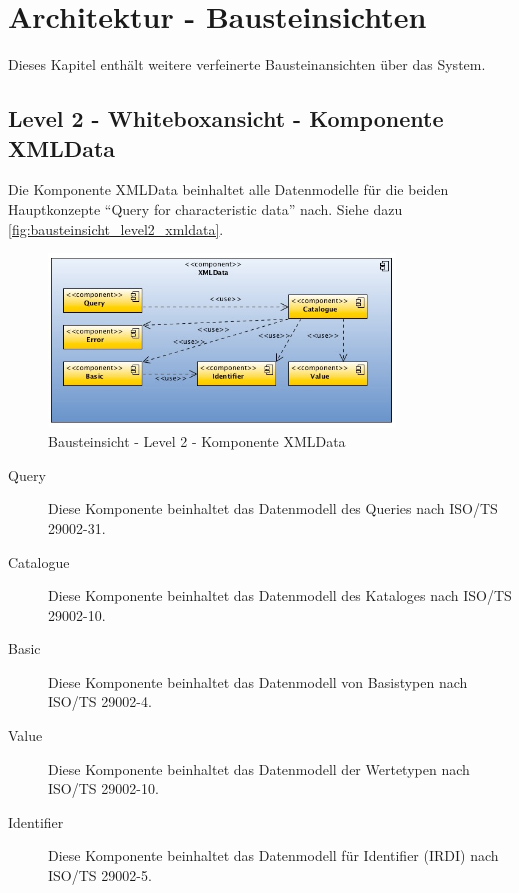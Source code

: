 \chapter{Architektur - Bausteinsichten} \label{kap:anh_architektur}

Dieses Kapitel enthält weitere verfeinerte Bausteinansichten über das System.

\section{Level 2 - Whiteboxansicht - Komponente XMLData}

Die Komponente XMLData beinhaltet alle Datenmodelle für die beiden Hauptkonzepte \enquote{Query for characteristic data} nach. Siehe dazu \autoref{fig:bausteinsicht_level2_xmldata}. 

\begin{figure}[htbp]
	\centering
		\includegraphics[width=0.82\textwidth]{images/bausteinsicht_plib_level2_xmldata.jpg}
	\caption{Bausteinsicht - Level 2 - Komponente XMLData}
	\label{fig:bausteinsicht_level2_xmldata}
\end{figure}

\begin{description}
\item[Query] Diese Komponente beinhaltet das Datenmodell des Queries nach ISO/TS 29002-31. 
\item[Catalogue] Diese Komponente beinhaltet das Datenmodell des Kataloges nach ISO/TS 29002-10. 
\item[Basic] Diese Komponente beinhaltet das Datenmodell von Basistypen nach ISO/TS 29002-4.
\item[Value] Diese Komponente beinhaltet das Datenmodell der Wertetypen nach ISO/TS 29002-10.
\item[Identifier] Diese Komponente beinhaltet das Datenmodell für Identifier (IRDI) nach ISO/TS 29002-5. 
\end{description}

